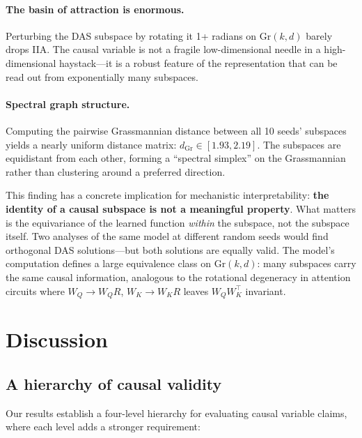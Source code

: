 \documentclass{article}
\newcommand{\Gr}{\mathrm{Gr}}
\begin{document}
\paragraph{The basin of attraction is enormous.}
Perturbing the DAS subspace by rotating it 1+ radians on $\Gr(k,d)$
barely drops IIA. The causal variable is not a fragile low-dimensional
needle in a high-dimensional haystack---it is a robust feature of the
representation that can be read out from exponentially many subspaces.

\paragraph{Spectral graph structure.}
Computing the pairwise Grassmannian distance between all 10 seeds'
subspaces yields a nearly uniform distance matrix:
$d_{\Gr} \in [1.93, 2.19]$. The subspaces are equidistant from each other,
forming a ``spectral simplex'' on the Grassmannian rather than clustering
around a preferred direction.

This finding has a concrete implication for mechanistic interpretability:
\textbf{the identity of a causal subspace is not a meaningful property}.
What matters is the equivariance of the learned function \emph{within} the
subspace, not the subspace itself. Two analyses of the same model at
different random seeds would find orthogonal DAS solutions---but both
solutions are equally valid. The model's computation defines a large
equivalence class on $\Gr(k,d)$: many subspaces carry the same causal
information, analogous to the rotational degeneracy in attention circuits
where $W_Q \to W_Q R$, $W_K \to W_K R$ leaves $W_Q W_K^\top$ invariant.

\section{Discussion}
\label{sec:discussion}

\subsection{A hierarchy of causal validity}

Our results establish a four-level hierarchy for evaluating causal variable
claims, where each level adds a stronger requirement:
\end{document}
